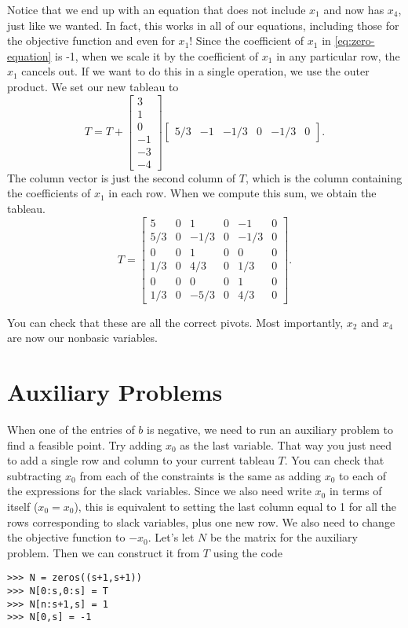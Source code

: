 Notice that we end up with an equation that does not include $x_1$ and now has $x_4$, just like we wanted.
In fact, this works in all of our equations, including those for the objective function and even for $x_1$!
Since the coefficient of $x_1$ in \eqref{eq:zero-equation} is -1, when we scale it by the coefficient of $x_1$ in any particular row, the $x_1$ cancels out.
If we want to do this in a single operation, we use the outer product.
We set our new tableau to
\[
	T = T + \begin{bmatrix}3 \\ 1 \\ 0 \\ -1 \\ -3 \\ -4\end{bmatrix}\begin{bmatrix} 5/3 & -1 & -1/3 & 0 & -1/3 & 0\end{bmatrix}.
\]
The column vector is just the second column of $T$, which is the column containing the coefficients of $x_1$ in each row.
When we compute this sum, we obtain the tableau.
\[
	T = \begin{bmatrix}
		5 &  0 & 1 & 0 & -1 & 0 \\
		5/3 & 0 &-1/3 & 0 &-1/3 & 0 \\
		0 & 0 & 1 & 0 & 0 & 0 \\
		1/3 & 0 & 4/3 & 0 & 1/3 & 0 \\
		0 & 0 & 0 & 0 & 1 & 0 \\
		1/3 & 0 & -5/3 & 0 & 4/3 & 0
	\end{bmatrix}.
\]

You can check that these are all the correct pivots.
Most importantly, $x_2$ and $x_4$ are now our nonbasic variables.

\section*{Auxiliary Problems}

When one of the entries of $b$ is negative, we need to run an auxiliary problem to find a feasible point.
Try adding $x_0$ as the last variable.
That way you just need to add a single row and column to your current tableau $T$.
You can check that subtracting $x_0$ from each of the constraints is the same as adding $x_0$ to each of the expressions for the slack variables.
Since we also need write $x_0$ in terms of itself ($x_0 = x_0$), this is equivalent to setting the last column equal to 1 for all the rows corresponding to slack variables, plus one new row.
We also need to change the objective function to $-x_0$.
Let's let $N$ be the matrix for the auxiliary problem.
Then we can construct it from $T$ using the code 
\begin{lstlisting}
>>> N = zeros((s+1,s+1))
>>> N[0:s,0:s] = T
>>> N[n:s+1,s] = 1
>>> N[0,s] = -1
\end{lstlisting}

